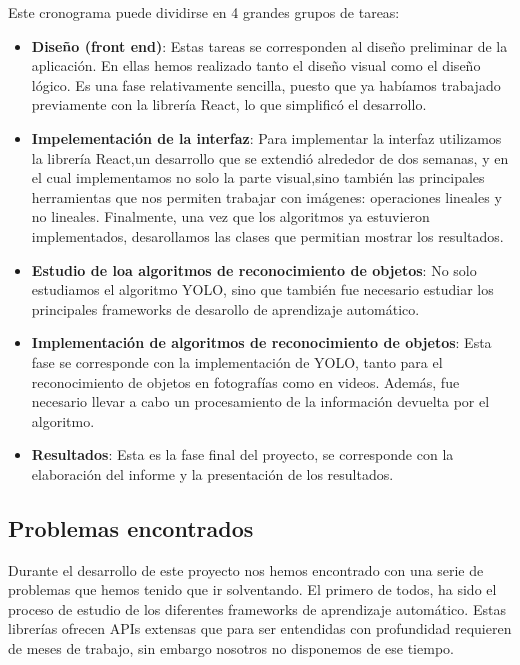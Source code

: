 \documentclass[a4paper]{article}
\begin{document}
Este cronograma puede dividirse en 4 grandes grupos de tareas:

\begin{itemize}
    \item \textbf{Diseño (front end)}: Estas tareas se corresponden al diseño preliminar de la 
    aplicación. En ellas hemos realizado tanto el diseño visual como el diseño lógico. Es una fase 
    relativamente sencilla, puesto que ya habíamos trabajado previamente con la librería React, lo
    que simplificó el desarrollo.
    \item \textbf{Impelementación de la interfaz}: Para implementar la interfaz utilizamos la librería
    React,un desarrollo que se extendió alrededor de dos semanas, y en el cual implementamos no solo 
    la parte visual,sino también las principales herramientas que nos permiten trabajar con imágenes: 
    operaciones lineales y no lineales. Finalmente, una vez que los algoritmos ya estuvieron 
    implementados, desarollamos las clases que permitian mostrar los resultados.
    \item \textbf{Estudio de loa algoritmos de reconocimiento de objetos}: No solo estudiamos el 
    algoritmo YOLO, sino que también fue necesario estudiar los principales frameworks de desarollo de
    aprendizaje automático.
    \item \textbf{Implementación de algoritmos de reconocimiento de objetos}: Esta fase se 
    corresponde con la implementación de YOLO, tanto para el reconocimiento de objetos en fotografías 
    como en videos. Además, fue necesario llevar a cabo un procesamiento de la información devuelta
    por el algoritmo.
    \item \textbf{Resultados}: Esta es la fase final del proyecto, se corresponde con la elaboración del informe y la presentación de los resultados.
\end{itemize}

\subsection{Problemas encontrados}
Durante el desarrollo de este proyecto nos hemos encontrado con una serie de problemas que hemos 
tenido que ir solventando. El primero de todos, ha sido el proceso de estudio de los diferentes 
frameworks de aprendizaje automático. Estas librerías ofrecen APIs extensas que para ser entendidas 
con profundidad requieren de meses de trabajo, sin embargo nosotros no disponemos de ese tiempo. \\
\end{document}
